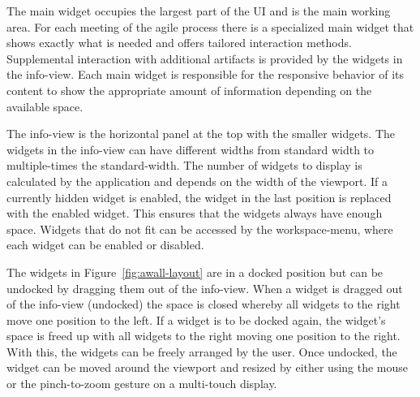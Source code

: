 \documentclass{sigchi}
\begin{document}
The main widget occupies the largest part of the UI and is the main working area.
For each meeting of the agile process there is a specialized main widget that shows exactly what is needed and offers tailored interaction methods.
Supplemental interaction with additional artifacts is provided by the widgets in the info-view.
Each main widget is responsible for the responsive behavior of its content to show the appropriate amount of information depending on the available space.


The info-view is the horizontal panel at the top with the smaller widgets.
The widgets in the info-view can have different widths from standard width to multiple-times the standard-width.
The number of widgets to display is calculated by the application and depends on the width of the viewport.
If a currently hidden widget is enabled, the widget in the last position is replaced with the enabled widget.
This ensures that the widgets always have enough space.
Widgets that do not fit can be accessed by the workspace-menu, where each widget can be enabled or disabled. 


The widgets in Figure~\ref{fig:awall-layout} are in a docked position but can be undocked by dragging them out of the info-view.
When a widget is dragged out of the info-view (undocked) the space is closed whereby all widgets to the right move one position to the left.
If a widget is to be docked again, the widget's space is freed up with all widgets to the right moving one position to the right.
With this, the widgets can be freely arranged by the user.
Once undocked, the widget can be moved around the viewport and resized by either using the mouse or the pinch-to-zoom gesture on a multi-touch display. 
\end{document}
